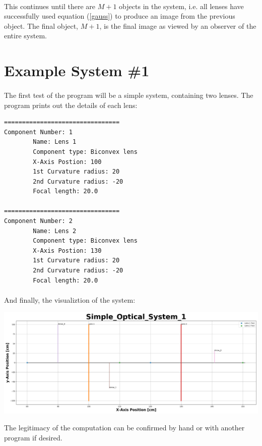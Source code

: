 \documentclass[12pt,letterpaper]{article}
\begin{document}
\paragraph*{}This continues until there are $M+1$ objects in the system, i.e. all lenses have successfully used equation (\ref{gauss}) to produce an image from the previous object. The final object, $M+1$, is the final image as viewed by an observer of the entire system.

\pagebreak

\section{Example System \#1}
\paragraph*{}The first test of the program will be a simple system, containing two lenses. The program prints out the details of each lens:
\begin{verbatim}
================================
Component Number: 1
        Name: Lens 1
        Component type: Biconvex lens
        X-Axis Postion: 100
        1st Curvature radius: 20
        2nd Curvature radius: -20
        Focal length: 20.0

================================
Component Number: 2
        Name: Lens 2
        Component type: Biconvex lens
        X-Axis Postion: 130
        1st Curvature radius: 20
        2nd Curvature radius: -20
        Focal length: 20.0
\end{verbatim}
\paragraph*{}And finally, the visualiztion of the system:
\begin{center}
\includegraphics[scale=0.34]{Simple_Optical_System_1}
\end{center}
The legitimacy of the computation can be confirmed by hand or with another program if desired.
\end{document}
